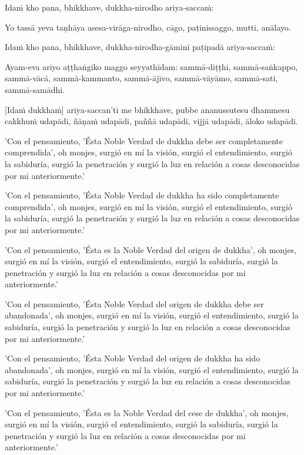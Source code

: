 Idaṁ kho pana, bhikkhave, dukkha-nirodho ariya-saccaṁ:

Yo tassā yeva taṇhāya asesa-virāga-nirodho, cāgo, paṭinissaggo, mutti,
anālayo.

Idaṁ kho pana, bhikkhave, dukkha-nirodha-gāminī paṭipadā ariya-saccaṁ:

Ayam-eva ariyo aṭṭhaṅgiko maggo seyyathīdam: sammā-diṭṭhi,
sammā-saṅkappo, sammā-vācā, sammā-kammanto, sammā-ājīvo, sammā-vāyāmo,
sammā-sati, sammā-samādhi.

\enlargethispage{\baselineskip}

[Idaṁ dukkhaṁ] ariya-saccan'ti me bhikkhave, pubbe ananussutesu dhammesu
cakkhuṁ udapādi, ñāṇaṁ udapādi, paññā udapādi, vijjā udapādi, āloko
udapādi.

\clearpage

\englishText
\markboth{\englishTitle}{\rightmark}

'Con el pensamiento, 'Ésta Noble Verdad de dukkha debe ser completamente comprendida', oh monjes, surgió en mí la visión, surgió el entendimiento, surgió la sabiduría, surgió la penetración y surgió la luz en relación a cosas desconocidas por mi anteriormente.'

'Con el pensamiento, 'Ésta Noble Verdad de dukkha ha sido completamente comprendida', oh monjes, surgió en mí la visión, surgió el entendimiento, surgió la sabiduría, surgió la penetración y surgió la luz en relación a cosas desconocidas por mi anteriormente.'

'Con el pensamiento, 'Ésta es la Noble Verdad del origen de dukkha', oh monjes, surgió en mí la visión, surgió el entendimiento, surgió la sabiduría, surgió la penetración y surgió la luz en relación a cosas desconocidas por mi anteriormente.'

'Con el pensamiento, 'Ésta Noble Verdad del origen de dukkha debe ser abandonada', oh monjes, surgió en mí la visión, surgió el entendimiento, surgió la sabiduría, surgió la penetración y surgió la luz en relación a cosas desconocidas por mi anteriormente.'

'Con el pensamiento, 'Ésta Noble Verdad del origen de dukkha ha sido abandonada', oh monjes, surgió en mí la visión, surgió el entendimiento, surgió la sabiduría, surgió la penetración y surgió la luz en relación a cosas desconocidas por mi anteriormente.'

'Con el pensamiento, 'Ésta es la Noble Verdad del cese de dukkha', oh monjes, surgió en mí la visión, surgió el entendimiento, surgió la sabiduría, surgió la penetración y surgió la luz en relación a cosas desconocidas por mi anteriormente.'

